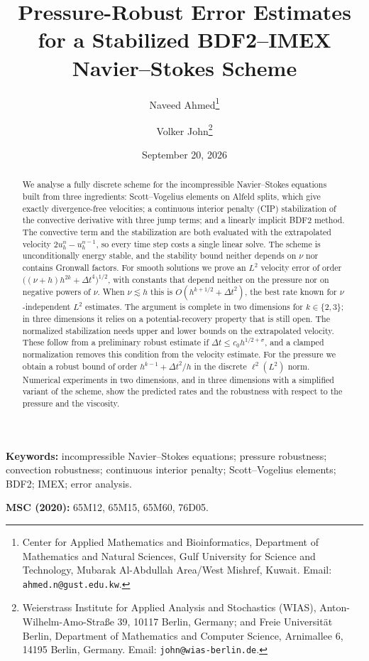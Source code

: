 \documentclass[11pt]{article}
\title{Pressure-Robust Error Estimates for a Stabilized BDF2--IMEX\\Navier--Stokes Scheme}
\author{%
Naveed Ahmed\thanks{Center for Applied Mathematics and Bioinformatics,
Department of Mathematics and Natural Sciences,
Gulf University for Science and Technology,
Mubarak Al-Abdullah Area/West Mishref, Kuwait.
Email: \texttt{ahmed.n@gust.edu.kw}.}
\and
Volker John\thanks{Weierstrass Institute for Applied Analysis and Stochastics (WIAS),
Anton-Wilhelm-Amo-Stra\ss e 39, 10117 Berlin, Germany;
and Freie Universit\"at Berlin, Department of Mathematics and Computer Science,
Arnimallee 6, 14195 Berlin, Germany.
Email: \texttt{john@wias-berlin.de}.}}
\date{September 20, 2026}
\theoremstyle{remark}\newtheorem{remark}{Remark}
\theoremstyle{plain}
\newcommand{\new}[1]{{\color{blue}#1}}
\begin{document}
\maketitle

\begin{abstract}
\new{We analyse a fully discrete scheme for the incompressible Navier--Stokes equations built from three ingredients: Scott--Vogelius elements on Alfeld splits, which give exactly divergence-free velocities; a continuous interior penalty (CIP) stabilization of the convective derivative with three jump terms; and a linearly implicit BDF2 method. The convective term and the stabilization are both evaluated with the extrapolated velocity $2u_h^n-u_h^{n-1}$, so every time step costs a single linear solve. The scheme is unconditionally energy stable, and the stability bound neither depends on $\nu$ nor contains Gronwall factors. For smooth solutions we prove an $L^2$ velocity error of order $\big((\nu+h)h^{2k}+\Delta t^4\big)^{1/2}$, with constants that depend neither on the pressure nor on negative powers of $\nu$. When $\nu\lesssim h$ this is $O(h^{k+1/2}+\Delta t^2)$, the best rate known for $\nu$-independent $L^2$ estimates. The argument is complete in two dimensions for $k\in\{2,3\}$; in three dimensions it relies on a potential-recovery property that is still open. The normalized stabilization needs upper and lower bounds on the extrapolated velocity. These follow from a preliminary robust estimate if $\Delta t\le c_0h^{1/2+\sigma}$, and a clamped normalization removes this condition from the velocity estimate. For the pressure we obtain a robust bound of order $h^{k-1}+\Delta t^2/h$ in the discrete $\ell^2(L^2)$ norm. Numerical experiments in two dimensions, and in three dimensions with a simplified variant of the scheme, show the predicted rates and the robustness with respect to the pressure and the viscosity.}
\end{abstract}

\noindent\textbf{Keywords:} incompressible Navier--Stokes equations; pressure robustness; convection robustness; continuous interior penalty; Scott--Vogelius elements; BDF2; IMEX; error analysis.

\noindent\textbf{MSC (2020):} 65M12, 65M15, 65M60, 76D05.

\end{document}
